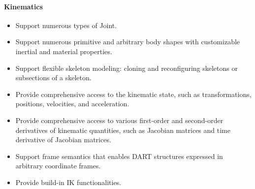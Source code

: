 \paragraph{Kinematics}
\begin{itemize}[leftmargin=*] \itemsep1pt \parskip0pt 
  \item Support numerous types of Joint.
  \item Support numerous primitive and arbitrary body shapes with customizable inertial and material properties.
  \item Support flexible skeleton modeling: cloning and reconfiguring skeletons or subsections of a skeleton.
  \item Provide comprehensive access to the kinematic state, such as transformations, positions, velocities, and acceleration.
  \item Provide comprehensive access to various first-order and second-order derivatives of kinematic quantities, such as Jacobian matrices and time derivative of Jacobian matrices. 
  \item Support frame semantics that enables DART structures expressed in arbitrary coordinate frames.
  \item Provide build-in IK functionalities.
\end{itemize}


